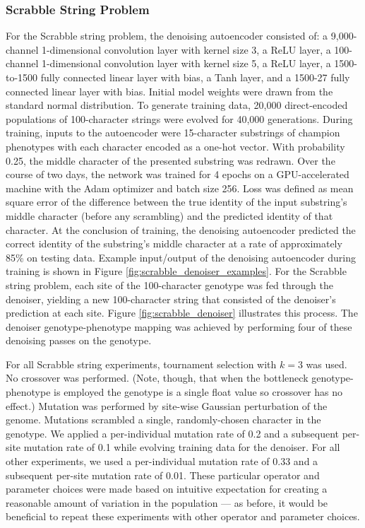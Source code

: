 \subsubsection{Scrabble String Problem}




For the Scrabble string problem, the denoising autoencoder consisted of: a 9,000-channel 1-dimensional convolution layer with kernel size 3, a ReLU layer, a 100-channel 1-dimensional convolution layer with kernel size 5, a ReLU layer, a 1500-to-1500 fully connected linear layer with bias, a Tanh layer, and a 1500-27 fully connected linear layer with bias.
Initial model weights were drawn from the standard normal distribution.
To generate training data, 20,000 direct-encoded populations of 100-character strings were evolved for 40,000 generations.
During training, inputs to the autoencoder were 15-character substrings of champion phenotypes with each character encoded as a one-hot vector.
With probability 0.25, the middle character of the presented substring was redrawn.
Over the course of two days, the network was trained for 4 epochs on a GPU-accelerated machine with the Adam optimizer and batch size 256.
Loss was defined as mean square error of the difference between the true identity of the input substring's middle character (before any scrambling) and the predicted identity of that character.
At the conclusion of training, the denoising autoencoder predicted the correct identity of the substring's middle character at a rate of approximately 85\% on testing data.
Example input/output of the denoising autoencoder during training is shown in Figure \ref{fig:scrabble_denoiser_examples}.
For the Scrabble string problem, each site of the 100-character genotype was fed through the denoiser, yielding a new 100-character string that consisted of the denoiser's prediction at each site.
Figure \ref{fig:scrabble_denoiser} illustrates this process.
The denoiser genotype-phenotype mapping was achieved by performing four of these denoising passes on the genotype.

For all Scrabble string experiments, tournament selection with $k = 3$ was used.
No crossover was performed.
(Note, though, that when the bottleneck genotype-phenotype is employed the genotype is a single float value so crossover has no effect.)
Mutation was performed by site-wise Gaussian perturbation of the genome.
Mutations scrambled a single, randomly-chosen character in the genotype.
We applied a per-individual mutation rate of 0.2 and a subsequent per-site mutation rate of 0.1 while evolving training data for the denoiser.
For all other experiments, we used a per-individual mutation rate of 0.33 and a subsequent per-site mutation rate of 0.01.
These particular operator and parameter choices were made based on intuitive expectation for creating a reasonable amount of variation in the population --- as before, it would be beneficial to repeat these experiments with other operator and parameter choices.

